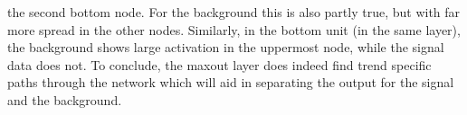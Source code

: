 the second bottom node. For the background this is also partly true, but with far more 
spread in the other nodes. Similarly, in the bottom unit (in the same layer), the background shows large
activation in the uppermost node, while the signal data does not. To conclude, the maxout layer does indeed 
find trend specific paths through the network which will aid in separating the output for the signal and the background.\\
\begin{figure}
\end{figure}
